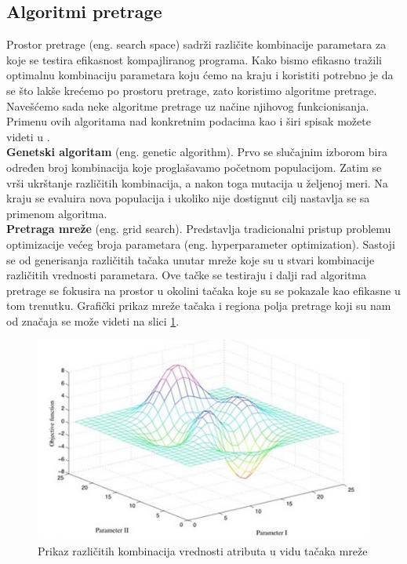 \documentclass[a4paper]{article}
\begin{document}
\subsection{Algoritmi pretrage}
\label{sec:pretrage}

Prostor pretrage (eng. search space) sadrži različite kombinacije parametara za koje se testira efikasnost kompajliranog 
programa. Kako bismo efikasno tražili optimalnu kombinaciju parametara koju ćemo na kraju i koristiti potrebno je da se što 
lakše krećemo po prostoru pretrage, zato koristimo algoritme pretrage. 
Navešćemo sada neke algoritme pretrage uz načine njihovog funkcionisanja. 
Primenu ovih algoritama nad konkretnim podacima kao i širi spisak možete videti u \cite{kisuki2000iterative}. \\

\textbf{Genetski algoritam} (eng. genetic algorithm). Prvo se slučajnim izborom bira određen broj kombinacija koje proglašavamo početnom populacijom. Zatim se vrši ukrštanje različitih kombinacija, a nakon toga mutacija u željenoj meri. Na kraju se evaluira nova populacija i ukoliko nije dostignut cilj nastavlja se sa primenom algoritma.\\

\textbf{Pretraga mreže} (eng. grid search). Predstavlja tradicionalni pristup problemu optimizacije većeg broja parametara (eng. hyperparameter optimization). 
Sastoji se od generisanja različitih tačaka unutar mreže koje su u stvari kombinacije različitih vrednosti parametara. 
Ove tačke se testiraju i dalji rad algoritma pretrage se fokusira na prostor u okolini tačaka koje su se pokazale kao efikasne u tom trenutku. Grafički prikaz mreže tačaka i regiona polja pretrage koji su nam od značaja se može videti na slici \ref{fig:slika1}.\\

\begin{figure}[h]
\includegraphics[scale=0.75]{grid.png}
\caption{Prikaz različitih kombinacija vrednosti atributa u vidu tačaka mreže}
\label{fig:slika1}
\end{figure}
\end{document}
